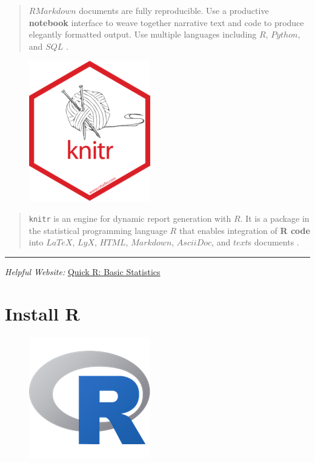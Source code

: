 \documentclass[]{book}
\begin{document}
\begin{quote}
\(R Markdown\) documents are fully reproducible. Use a productive
\textbf{notebook} interface to weave together narrative text and code to
produce elegantly formatted output. Use multiple languages including
\(R\), \(Python\), and \(SQL\) \citep{R-rmarkdown}.
\end{quote}

\begin{figure}
\centering
\includegraphics{images/hex/knitr-200x232.png}
\caption{}
\end{figure}

\begin{quote}
\texttt{knitr} is an engine for dynamic report generation with \(R\). It
is a package in the statistical programming language \(R\) that enables
integration of \textbf{R code} into \(LaTeX\), \(LyX\), \(HTML\),
\(Markdown\), \(AsciiDoc\), and \(text\)s documents \citep{R-knitr}.
\end{quote}

\begin{center}\rule{0.5\linewidth}{\linethickness}\end{center}

\emph{Helpful Website:}
\href{https://www.statmethods.net/stats/index.html}{Quick R: Basic
Statistics}

\chapter{Install R}\label{install-r}

\begin{figure}
\centering
\includegraphics{images/Rlogo_200.png}
\caption{}
\end{figure}
\end{document}
